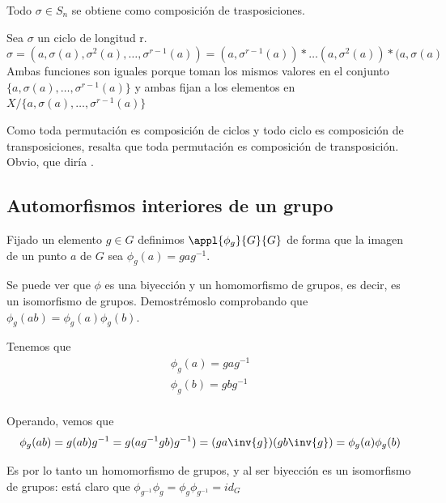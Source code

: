 \documentclass[nochap]{apuntes}
\begin{document}
\begin{theorem}
Todo $\sigma \in S_n$ se obtiene como composición de trasposiciones.
\end{theorem}

\begin{example}
Sea $\sigma$ un ciclo de longitud r. \\
$\sigma = ( a, \sigma (a), \sigma ^2(a), \hdots, \sigma ^{r-1}(a)) =
(a, \sigma ^{r-1}(a))\ast \hdots (a, \sigma ^2(a)) \ast(a, \sigma (a) $
\\Ambas funciones son iguales porque toman los mismos valores en el conjunto \\ $\{a, \sigma (a),\hdots , \sigma ^{r-1} (a) \}$ y ambas fijan a los elementos en $X / \{a, \sigma (a),\hdots , \sigma ^{r-1} (a) \}$ 
\end{example}

\obs Como toda permutación es composición de ciclos y todo ciclo es composición de transposiciones, resalta que toda permutación es composición de transposición. Obvio, que diría \href{http://www.uam.es/personal_pdi/ciencias/dyakubov/dimitry.jpg}{\color{blue}{Dmitry}}.


\subsection{Automorfismos interiores de un grupo}

Fijado un elemento $g\in G$ definimos $\appl{\phi _g}{G}{G}$ de forma que la imagen
de un punto $a$ de $G$ sea $\phi _g(a) = gag^{-1}$.

Se puede ver que $\phi$ es una biyección y un homomorfismo de grupos, es decir, es un isomorfismo de grupos. Demostrémoslo comprobando que $\phi_g(ab) = \phi_g(a)\phi_g(b)$. 

Tenemos que
\begin{gather*}
\phi _g (a) = g a g^{-1}\\
\phi _g (b) = g b g^{-1}\\
\end{gather*}

Operando, vemos que
\[ \phi _g (a b) = g (a b) g^{-1} = g (a g^{-1} g b) g^{-1}) = (ga\inv{g}) (g b \inv{g}) = \phi _g (a) \phi _g(b) \]

Es por lo tanto un homomorfismo de grupos, y al ser biyección es un isomorfismo de grupos: está claro que $\phi _{g^{-1}} \phi _g = \phi _g \phi _{g^{-1}} = id_G$
\end{document}
